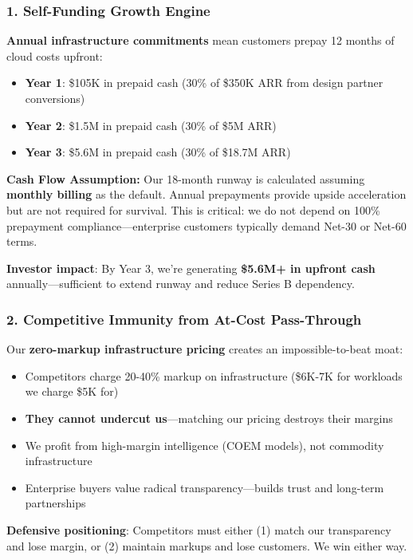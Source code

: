 \subsubsection{1. Self-Funding Growth Engine}

\textbf{Annual infrastructure commitments} mean customers prepay 12 months of cloud costs upfront:

\begin{itemize}[noitemsep]
    \item \textbf{Year 1}: \$105K in prepaid cash (30\% of \$350K ARR from design partner conversions)
    \item \textbf{Year 2}: \$1.5M in prepaid cash (30\% of \$5M ARR)
    \item \textbf{Year 3}: \$5.6M in prepaid cash (30\% of \$18.7M ARR)
\end{itemize}

\textbf{Cash Flow Assumption:} Our 18-month runway is calculated assuming \textbf{monthly billing} as the default. Annual prepayments provide upside acceleration but are not required for survival. This is critical: we do not depend on 100\% prepayment compliance—enterprise customers typically demand Net-30 or Net-60 terms.

\textbf{Investor impact}: By Year 3, we're generating \textbf{\$5.6M+ in upfront cash} annually—sufficient to extend runway and reduce Series B dependency.

\subsubsection{2. Competitive Immunity from At-Cost Pass-Through}

Our \textbf{zero-markup infrastructure pricing} creates an impossible-to-beat moat:

\begin{itemize}[noitemsep]
    \item Competitors charge 20-40\% markup on infrastructure (\$6K-7K for workloads we charge \$5K for)
    \item \textbf{They cannot undercut us}—matching our pricing destroys their margins
    \item We profit from high-margin intelligence (COEM models), not commodity infrastructure
    \item Enterprise buyers value radical transparency—builds trust and long-term partnerships
\end{itemize}

\textbf{Defensive positioning}: Competitors must either (1) match our transparency and lose margin, or (2) maintain markups and lose customers. We win either way.

